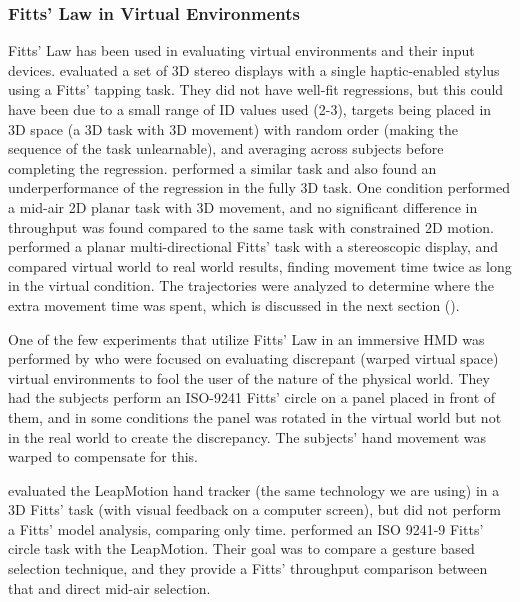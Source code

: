 \subsubsection{Fitts' Law in Virtual Environments}\label{applying-fitts-to-virtual-environment}

Fitts' Law has been used in evaluating virtual environments and their input devices.
\citet{chun_evaluating_2004} evaluated a set of 3D stereo displays with a single haptic-enabled stylus using a Fitts' tapping task.
They did not have well-fit regressions, but this could have been due to a small range of ID values used (2-3), targets being placed in 3D space (a 3D task with 3D movement) with random order (making the sequence of the task unlearnable), and averaging across subjects before completing the regression.
\citet{teather_evaluating_2010} performed a similar task and also found an underperformance of the regression in the fully 3D task.
One condition performed a mid-air 2D planar task with 3D movement, and no significant difference in throughput was found compared to the same task with constrained 2D motion.
\citet{liu_comparing_2009} performed a planar multi-directional Fitts' task with a stereoscopic display, and compared virtual world to real world results, finding movement time twice as long in the virtual condition.
The trajectories were analyzed to determine where the extra movement time was spent, which is discussed in the next section ().

One of the few experiments that utilize Fitts' Law in an immersive HMD was performed by \citet{kohli_redirected_2012} who were focused on evaluating discrepant (warped virtual space) virtual environments to fool the user of the nature of the physical world.
They had the subjects perform an ISO-9241 Fitts' circle on a panel placed in front of them, and in some conditions the panel was rotated in the virtual world but not in the real world to create the discrepancy.
The subjects' hand movement was warped to compensate for this.

\citet{coelho_pointing_2014} evaluated the LeapMotion hand tracker (the same technology we are using) in a 3D Fitts' task (with visual feedback on a computer screen), but did not perform a Fitts' model analysis, comparing only time.
\citet{seixas_one_2015} performed an ISO 9241-9 Fitts' circle task with the LeapMotion.
Their goal was to compare a gesture based selection technique, and they provide a Fitts' throughput comparison between that and direct mid-air selection.

